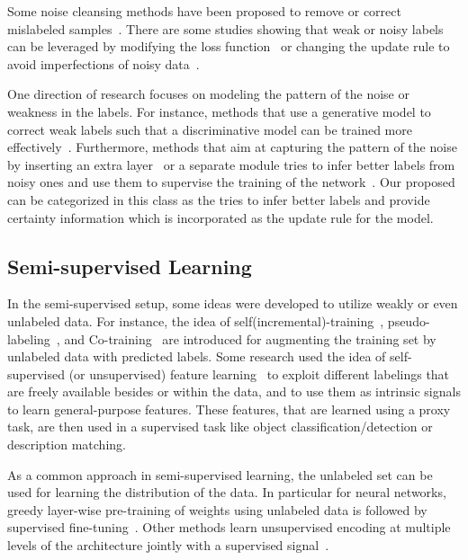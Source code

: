 Some noise cleansing methods have been proposed to remove or correct mislabeled samples~\citep{Brodley:1999}.
There are some studies showing that weak or noisy labels can be leveraged by modifying the loss function~\citep{reed2014training, Patrini:2016, patrini2016loss, Vahdat:2017} or changing the update rule to avoid imperfections of noisy data~\citep{malach2017decoupling, Dehghani:2017:nips_metalearn, Dehghani:2017avoiding}.  

One direction of research focuses on modeling the pattern of the noise or weakness in the labels. For instance, methods that use a generative model to correct weak labels such that a discriminative model can be trained more effectively~\citep{Ratner:2016,Rekatsinas:2017,Varma:2017}.
Furthermore, methods that aim at capturing the pattern of the noise by inserting an extra layer~\citep{goldberger2016training} or a separate module tries to infer better labels from noisy ones and use them to supervise the training of the network~\citep{Sukhbaatar:2014,Veit:2017, Dehghani:2017:nips_metalearn}. Our proposed \fwl can be categorized in this class as the \tch tries to infer better labels and provide certainty information which is incorporated as the update rule for the \std model.

\subsection{Semi-\:supervised Learning}
In the semi-supervised setup, some ideas were developed to utilize weakly or even unlabeled data. For instance, the idea of self(incremental)-training~\citep{Rosenberg:2005}, pseudo-labeling~\citep{Lee:2013,Hinton:2015}, and Co-training~\citep{Blum:1998} are introduced for augmenting the training set by unlabeled data with predicted labels.
Some research used the idea of self-supervised (or unsupervised) feature learning~\citep{noroozi2016unsupervised,dosovitskiy2016discriminative,donahue2016adversarial} to exploit different labelings that are freely available besides or within the data, and to use them as intrinsic signals to learn general-purpose features. These features, that are learned using a proxy task, are then used in a supervised task like object classification/detection or description matching.

As a common approach in semi-supervised learning, the unlabeled set can be used for learning the distribution of the data. In particular for neural networks, greedy layer-wise pre-training of weights using unlabeled data is followed by supervised fine-tuning~\citep{Hinton:2006,Deriu:2017,Severyn:2015:SemEval,Severyn:2015:SIGIR,Go:2009}. Other methods learn unsupervised encoding at multiple levels of the architecture jointly with a supervised signal~\citep{Ororbia:2015,Weston:2012}.


